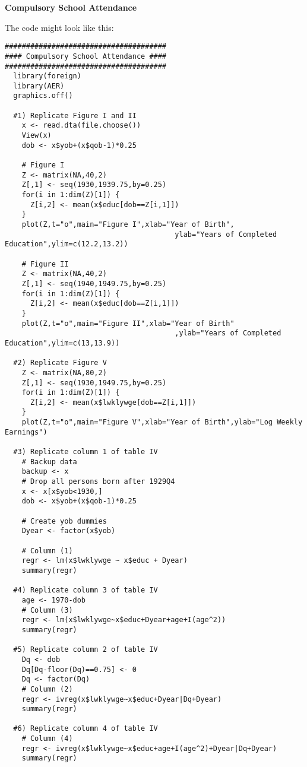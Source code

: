 \begin{Solution}{13.3}
\textbf{Compulsory School Attendance}

The code might look like this:
\begin{verbatim}
######################################
#### Compulsory School Attendance ####
######################################
  library(foreign)
  library(AER)
  graphics.off()

  #1) Replicate Figure I and II
    x <- read.dta(file.choose())
    View(x)
    dob <- x$yob+(x$qob-1)*0.25

    # Figure I
    Z <- matrix(NA,40,2)
    Z[,1] <- seq(1930,1939.75,by=0.25)
    for(i in 1:dim(Z)[1]) {
      Z[i,2] <- mean(x$educ[dob==Z[i,1]])
    }
    plot(Z,t="o",main="Figure I",xlab="Year of Birth",
                                        ylab="Years of Completed Education",ylim=c(12.2,13.2))

    # Figure II
    Z <- matrix(NA,40,2)
    Z[,1] <- seq(1940,1949.75,by=0.25)
    for(i in 1:dim(Z)[1]) {
      Z[i,2] <- mean(x$educ[dob==Z[i,1]])
    }
    plot(Z,t="o",main="Figure II",xlab="Year of Birth"
                                        ,ylab="Years of Completed Education",ylim=c(13,13.9))

  #2) Replicate Figure V
    Z <- matrix(NA,80,2)
    Z[,1] <- seq(1930,1949.75,by=0.25)
    for(i in 1:dim(Z)[1]) {
      Z[i,2] <- mean(x$lwklywge[dob==Z[i,1]])
    }
    plot(Z,t="o",main="Figure V",xlab="Year of Birth",ylab="Log Weekly Earnings")

  #3) Replicate column 1 of table IV
    # Backup data
    backup <- x
    # Drop all persons born after 1929Q4
    x <- x[x$yob<1930,]
    dob <- x$yob+(x$qob-1)*0.25

    # Create yob dummies
    Dyear <- factor(x$yob)

    # Column (1)
    regr <- lm(x$lwklywge ~ x$educ + Dyear)
    summary(regr)

  #4) Replicate column 3 of table IV
    age <- 1970-dob
    # Column (3)
    regr <- lm(x$lwklywge~x$educ+Dyear+age+I(age^2))
    summary(regr)

  #5) Replicate column 2 of table IV
    Dq <- dob
    Dq[Dq-floor(Dq)==0.75] <- 0
    Dq <- factor(Dq)
    # Column (2)
    regr <- ivreg(x$lwklywge~x$educ+Dyear|Dq+Dyear)
    summary(regr)

  #6) Replicate column 4 of table IV
    # Column (4)
    regr <- ivreg(x$lwklywge~x$educ+age+I(age^2)+Dyear|Dq+Dyear)
    summary(regr)
\end{verbatim}
\end{Solution}
